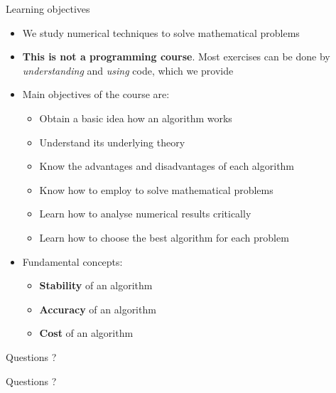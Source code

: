 \begin{frame}{Learning objectives}
    \begin{itemize}
        \item We study \alert{numerical techniques}
            to solve mathematical problems\\[1.0em]
        \item \textbf{This is not a programming course}.
            Most exercises can be done by \emph{understanding} and \emph{using} code,
            which we provide
        \vspace{0.5em}
        \item \alert{Main objectives} of the course are:
            \begin{itemize}
                \vspace{-0.2em}
                \item Obtain a basic idea how an algorithm works
                \vspace{-0.2em}
                \item Understand its underlying theory
                \vspace{-0.2em}
                \item Know the advantages and disadvantages of each algorithm
                \vspace{-0.2em}
                \item Know how to employ \julia
                    to solve mathematical problems
                \vspace{-0.2em}
                \item Learn how to analyse numerical results critically
                \vspace{-0.2em}
                \item Learn how to choose the best algorithm for each problem
            \end{itemize}
        \vspace{0.5em}
        \item \alert{Fundamental concepts:}
            \begin{itemize}
                \vspace{-0.2em}
                \item \textbf{Stability} of an algorithm
                \vspace{-0.2em}
                \item \textbf{Accuracy} of an algorithm
                \vspace{-0.2em}
                \item \textbf{Cost} of an algorithm
            \end{itemize}
    \end{itemize}
\end{frame}

\begin{frame}{Questions ?}
    \begin{center}
        \huge{Questions ?}
    \end{center}
\end{frame}
